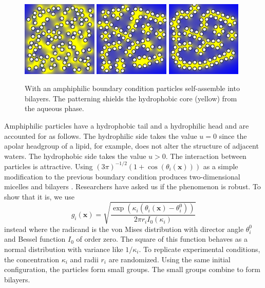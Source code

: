 \begin{figure}[h!]
\begin{center}  
    \includegraphics[width=0.32\textwidth]{figures/SpecificAim1/N100B1.pdf}
    \includegraphics[width=0.32\textwidth]{figures/SpecificAim1/N100B2.pdf}
    \includegraphics[width=0.32\textwidth]{figures/SpecificAim1/N100B3.pdf}\\
\end{center}    
\caption{With an amphiphilic boundary condition particles self-assemble
  into bilayers. The patterning shields the hydrophobic core (yellow) from the
  aqueous phase. 
      \label{fig:self-assemblyA}}
\end{figure}
Amphiphilic particles have a hydrophobic tail and a hydrophilic head
and are accounted for as follows.
The hydrophilic side takes the value $u = 0$ since the
apolar headgroup of a lipid, for example, does not alter the structure
of adjacent waters. The hydrophobic side takes the value $u > 0$. 
The interaction between particles is attractive. Using
$(3\pi )^{-1/2}(1 + \cos(\theta_i(\mathbf{x})))$
as a simple modification to the previous boundary condition 
produces two-dimensional micelles and bilayers \cite{Fu2018_SIAM}.
Researchers have asked us if the phenomenon is robust. To show
that it is, we use 
\begin{equation}
\label{eq:vonMises}
g_i(\mathbf{x}) =
\sqrt{
  \frac{\exp( \kappa_i(\theta_i(\mathbf{x}) - \theta^0_i))}
  {2\pi r_i I_0(\kappa_i)}}
\end{equation}
instead where the radicand is the von Mises 
distribution with director angle $\theta^0_i$ and Bessel function
$I_0$ of order zero. The square of this function behaves as a normal
distribution with variance like $1/\kappa_i$. To replicate
experimental conditions, the concentration $\kappa_i$ and radii
$r_i$ are randomized. Using the same initial configuration, the
particles form small groups. The small groups combine to form bilayers.


